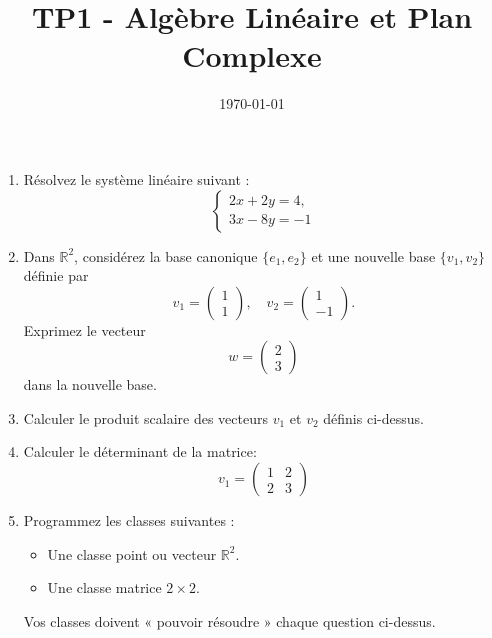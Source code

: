 \documentclass[a4paper,12pt]{article}
\title{TP1 - Algèbre Linéaire et Plan Complexe}
\author{}
\date{\today}
\begin{document}
\makeonlytitle




\begin{enumerate}
    \item Résolvez le système linéaire suivant :
\[
\begin{cases}
2x + 2y = 4,\\[1mm]
3x - 8y  = -1 
\end{cases}
\]
    \item Dans \(\mathbb{R}^2\), considérez la base canonique \(\{e_1, e_2\}\) et une nouvelle base \(\{v_1, v_2\}\) définie par
\[
v_1 = \begin{pmatrix} 1 \\ 1 \end{pmatrix}, \quad
v_2 = \begin{pmatrix} 1 \\ -1 \end{pmatrix}.
\]
Exprimez le vecteur 
\[
w = \begin{pmatrix} 2 \\ 3 \end{pmatrix}
\]
dans la nouvelle base.
    \item Calculer le produit scalaire des vecteurs $v_1$ et $v_2$ définis ci-dessus.
    \item Calculer le déterminant de la matrice:
\[
v_1 = 
    \begin{pmatrix} 
        1 & 2 \\ 
        2 & 3 
    \end{pmatrix}
\]
    \item Programmez les classes suivantes :
    \begin{itemize}
        \item Une classe point ou vecteur $\mathbb{R}^2$.
        \item Une classe matrice $2\times2$.
    \end{itemize}
    Vos classes doivent « pouvoir résoudre » chaque question ci-dessus.
\end{enumerate}



\end{document}

